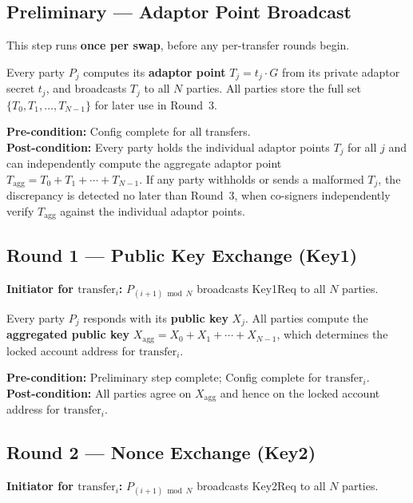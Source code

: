 \documentclass[11pt,a4paper,dvipsnames]{article}
\newcommand{\msg}[1]{\textsf{#1}}
\newcommand{\Tagg}{T_{\mathrm{agg}}}
\newcommand{\Xagg}{X_{\mathrm{agg}}}
\begin{document}
\subsection{Preliminary — Adaptor Point Broadcast}
\label{sec:setup-prelim}

This step runs \textbf{once per swap}, before any per-transfer rounds begin.

Every party $P_j$ computes its \textbf{adaptor point} $T_j = t_j \cdot G$
from its private adaptor secret $t_j$, and broadcasts $T_j$ to all $N$ parties.
All parties store the full set $\{T_0, T_1, \ldots, T_{N-1}\}$ for later use
in Round~3.

\noindent\textbf{Pre-condition:} Config complete for all transfers.\\
\noindent\textbf{Post-condition:} Every party holds the individual adaptor
points $T_j$ for all $j$ and can independently compute the aggregate adaptor
point $\Tagg = T_0 + T_1 + \cdots + T_{N-1}$.
If any party withholds or sends a malformed $T_j$, the discrepancy is
detected no later than Round~3, when co-signers independently verify
$\Tagg$ against the individual adaptor points.


\subsection{Round 1 — Public Key Exchange (\msg{Key1})}

\textbf{Initiator for $\mathrm{transfer}_i$:}
$P_{(i+1)\bmod N}$ broadcasts \msg{Key1Req} to all $N$ parties.

Every party $P_j$ responds with its \textbf{public key} $X_j$.
All parties compute the \textbf{aggregated public key}
$\Xagg = X_0 + X_1 + \cdots + X_{N-1}$,
which determines the locked account address for $\mathrm{transfer}_i$.

\noindent\textbf{Pre-condition:} Preliminary step complete; Config complete for $\mathrm{transfer}_i$.\\
\textbf{Post-condition:} All parties agree on $\Xagg$ and hence on the locked
account address for $\mathrm{transfer}_i$.

\subsection{Round 2 — Nonce Exchange (\msg{Key2})}

\textbf{Initiator for $\mathrm{transfer}_i$:}
$P_{(i+1)\bmod N}$ broadcasts \msg{Key2Req} to all $N$ parties.
\end{document}
